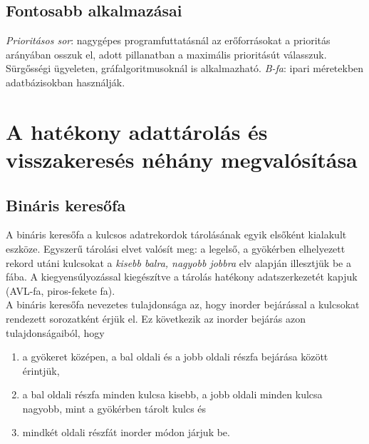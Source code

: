 \documentclass[12pt,margin=0px]{article}
\begin{document}
	\subsection*{Fontosabb alkalmazásai}
	
    \textit{Prioritásos sor}: nagygépes programfuttatásnál az erőforrásokat a prioritás arányában osszuk el, adott pillanatban a maximális prioritásút válasszuk. Sürgősségi ügyeleten, gráfalgoritmusoknál is alkalmazható.
	\textit{B-fa}: ipari méretekben adatbázisokban használják.
	
	\section*{A hatékony adattárolás és visszakeresés néhány megvalósítása}
	
	\subsection*{Bináris keresőfa}
	
    \noindent A bináris keresőfa a kulcsos adatrekordok tárolásának egyik elsőként kialakult eszköze. Egyszerű tárolási elvet valósít meg: a legelső, a gyökérben elhelyezett rekord utáni kulcsokat a \emph{kisebb balra, nagyobb jobbra} elv alapján illesztjük be a fába. A kiegyensúlyozással kiegészítve a tárolás hatékony adatszerkezetét kapjuk (AVL-fa, piros-fekete fa).\\

    \noindent A bináris keresőfa nevezetes tulajdonsága az, hogy inorder bejárással a kulcsokat rendezett sorozatként érjük el. Ez következik az inorder bejárás azon tulajdonságaiból, hogy
    \begin{enumerate}
        \item a gyökeret középen, a bal oldali és a jobb oldali részfa bejárása között érintjük,
        \item a bal oldali részfa minden kulcsa kisebb, a jobb oldali minden kulcsa nagyobb, mint a gyökérben tárolt kulcs és
        \item mindkét oldali részfát inorder módon járjuk be.
    \end{enumerate}
\end{document}
